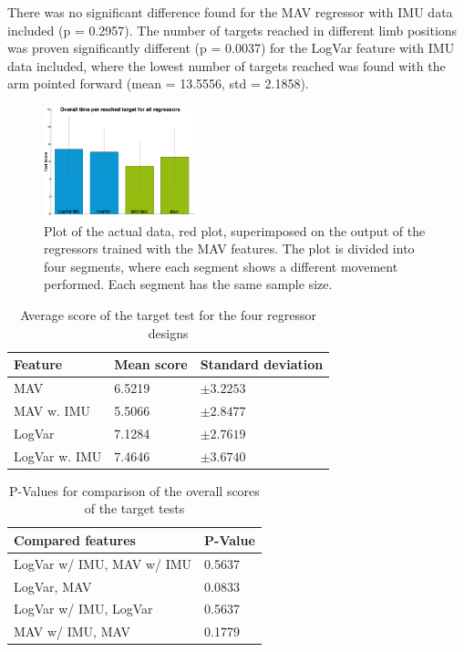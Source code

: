 	There was no significant difference found for the MAV regressor with IMU data included (p = 0.2957). The number of targets reached in different limb positions was proven significantly different (p = 0.0037) for the LogVar feature with IMU data included, where the lowest number of targets reached was found with the arm pointed forward (mean = 13.5556, std = 2.1858).
	
	\begin{figure}[!thpb]
		\centering
		\includegraphics[width=0.4\textwidth]{figures/allRegressorBarzTimeScoreForTargetTest}  %
		\caption{Plot of the actual data, red plot, superimposed on the output of the regressors trained with the MAV features. The plot is divided into four segments, where each segment shows a different movement performed. Each segment has the same sample size.}
		\label{fig:TimeScoreTargets}  %
	\end{figure}
	
	\begin{table}[!thpb]
		\begin{center}
			\begin{tabular}{l l l}
				\hline
				\textbf{Feature} & \textbf{Mean score} & \textbf{Standard deviation}\\
				\hline
				MAV & 6.5219 & $\pm 3.2253$ \\
				MAV w. IMU & 5.5066 & $\pm 2.8477$ \\
				LogVar & 7.1284 & $\pm 2.7619$ \\
				LogVar w. IMU & 7.4646 & $\pm 3.6740$ \\
				\hline
			\end{tabular}
			\caption{Average score of the target test for the four regressor designs}
		\end{center}
	\end{table}
	
	\begin{table}[!thpb]
		\begin{center}
			\begin{tabular}{l l}
				\hline
				\textbf{Compared features} & \textbf{P-Value}\\
				\hline
				LogVar w/ IMU, MAV w/ IMU & 0.5637 \\
				LogVar, MAV & 0.0833 \\
				LogVar w/ IMU, LogVar & 0.5637 \\
				MAV w/ IMU, MAV & 0.1779 \\
				\hline
			\end{tabular}
			\caption{P-Values for comparison of the overall scores of the target tests}
		\end{center}
	\end{table}
	
